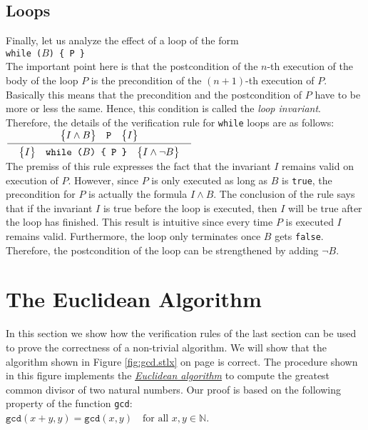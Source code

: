 \subsection{Loops}
Finally, let us analyze the effect of a loop of the form
\\[0.2cm]
\hspace*{1.3cm}
\texttt{while ($B$) \{ P \}} 
\\[0.2cm]
The important point here is that the postcondition of the $n$-th
execution of the body of the loop $P$ is the precondition of the $(n\!+\!1)$-th
execution of $P$.  Basically this means that the precondition and the
postcondition of $P$ have to be more or less the same.
Hence, this condition is called the \emph{loop invariant}.  Therefore,
the details of the verification rule for \texttt{while} loops are as follows:
\\[0.2cm]
\hspace*{1.3cm}
$\bruch{\hoare{I \wedge B}{P}{I}}{\quad \hoare{I}{while ($B$) \{ P \}}{I \wedge \neg B}\quad}$
\\[0.2cm]
The premiss of this rule expresses the fact that the invariant $I$ remains valid on execution of $P$.
However, since $P$ is only executed as long as $B$ is \texttt{true}, the precondition for $P$ is actually 
the formula $I \wedge B$.  The conclusion of the rule says that if the invariant $I$ is true before
the loop is executed, then $I$ will be true after the loop has finished.  This result is intuitive
since every time $P$ is executed $I$ remains valid.  Furthermore, the loop only terminates once $B$
gets \texttt{false}.  Therefore, the postcondition of the loop can be strengthened by adding $\neg B$.



\section{The Euclidean  Algorithm}
In this section we show how the verification rules of the last section can be used to prove the
correctness of a non-trivial algorithm.
We will show that the algorithm shown in Figure \ref{fig:gcd.stlx} on page \pageref{fig:gcd.stlx} is correct.
The procedure shown in this figure implements the
\href{http://en.wikipedia.org/wiki/Euclidean_algorithm}{\emph{Euclidean algorithm}}
to compute the greatest common divisor of two natural numbers.  Our proof is based on the following
property of the function \texttt{gcd}:
\\[0.2cm]
\hspace*{1.3cm}
$\texttt{gcd}(x + y, y) = \texttt{gcd}(x,y) \quad \mbox{for all $x, y \in \mathbb{N}$}$.


